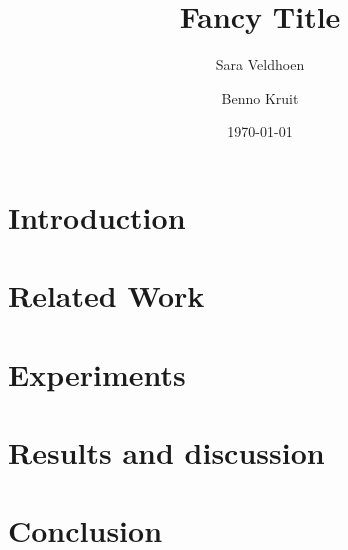 \documentclass[twocolumn]{article}
\title{Fancy Title}
\author{Sara Veldhoen \and Benno Kruit}
\date{\today}
\begin{document}
\maketitle

\section{Introduction}\label{s:introduction}

\section{Related Work}\label{s:relatedWork}

\section{Experiments}\label{s:experiments}

\section{Results and discussion}\label{s:results}

\section{Conclusion}\label{s:conclusion}




\end{document}
